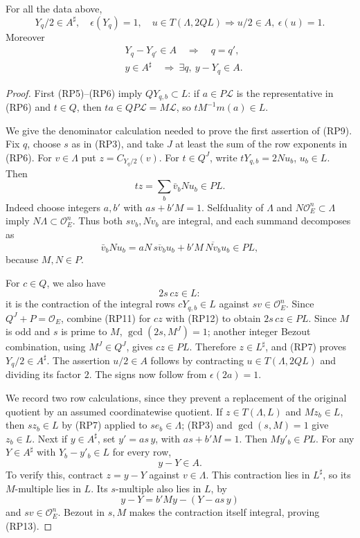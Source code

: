\begin{srlemma}
\label{lem:ftb-root-halves}
For all the data above,
\[
 Y_q/2\in A^\sharp,\quad
       \epsilon(Y_q)=1,\quad
 u\in T(\Lambda,2QL)\Longrightarrow u/2\in A,\
                                      \epsilon(u)=1.       \tag{RP9}
\]
Moreover
\[
 \begin{split}
 &Y_q-Y_{q'}\in A\quad\Longrightarrow\quad q=q',\\
 &y\in A^\sharp\quad\Longrightarrow\
                      \exists q,\ y-Y_q\in A .
 \end{split}                                              \tag{RP10}
\]
\end{srlemma}

\begin{proof}
First (RP5)--(RP6) imply \(QY_{q,b}\subset L\):
if \(a\in P\mathcal L\) is the representative in (RP6) and
\(t\in Q\), then \(ta\in QP\mathcal L=M\mathcal L\), so
\(tM^{-1}m(a)\in L\).

We give the denominator calculation needed to prove the first
assertion of (RP9). Fix \(q\), choose \(s\) as in (RP3), and take
\(J\) at least the sum of the row exponents in (RP6).
For \(v\in\Lambda\) put \(z=C_{Y_q/2}(v)\).
For \(t\in Q^J\), write \(tY_{q,b}=2Nu_b\), \(u_b\in L\).
Then
\[
                         tz=\sum_b\bar v_bNu_b\in PL.     \tag{RP11}
\]
Indeed choose integers \(a,b'\) with \(as+b'M=1\).
Selfduality of \(\Lambda\) and \(N\mathcal O_E^n\subset\Lambda\)
imply \(N\Lambda\subset\mathcal O_E^n\).
Thus both \(sv_b,Nv_b\) are integral, and each summand decomposes as
\[
 \bar v_bNu_b
    =aN\,\overline{sv_b}u_b
                   +b'M\,\overline{Nv_b}u_b\in PL,
\]
because \(M,N\in P\).

For \(c\in Q\), we also have
\[
                          2s\,cz\in L:                  \tag{RP12}
\]
it is the contraction of the integral rows \(cY_{q,b}\in L\)
against \(sv\in\mathcal O_E^n\).
Since \(Q^J+P=\mathcal O_E\), combine (RP11) for \(cz\)
with (RP12) to obtain \(2s\,cz\in PL\).
Since \(M\) is odd and \(s\) is prime to \(M\),
\(\gcd(2s,M^J)=1\); another integer Bezout combination, using
\(M^J\in Q^J\), gives \(cz\in PL\).
Therefore \(z\in L^\sharp\), and (RP7) proves \(Y_q/2\in A^\sharp\).
The assertion \(u/2\in A\) follows by contracting
\(u\in T(\Lambda,2QL)\) and dividing its factor \(2\).
The signs now follow from \(\epsilon(2a)=1\).

We record two row calculations, since they prevent a replacement
of the original quotient by an assumed coordinatewise quotient.
If \(z\in T(\Lambda,L)\) and \(Mz_b\in L\), then \(sz_b\in L\)
by (RP7) applied to \(se_b\in\Lambda\); (RP3) and
\(\gcd(s,M)=1\) give \(z_b\in L\).
Next if \(y\in A^\sharp\), set \(y'=as\,y\), with
\(as+b'M=1\). Then \(My'_b\in PL\).
For any \(Y\in A^\sharp\) with \(Y_b-y'_b\in L\) for every row,
\[
                              y-Y\in A.                 \tag{RP13}
\]
To verify this, contract \(z=y-Y\) against \(v\in\Lambda\).
This contraction lies in \(L^\sharp\), so its \(M\)-multiple
lies in \(L\). Its \(s\)-multiple also lies in \(L\), by
\[
 y-Y=b'My-(Y-as\,y)
\]
and \(sv\in\mathcal O_E^n\). Bezout in \(s,M\) makes the
contraction itself integral, proving (RP13).


\end{proof}
